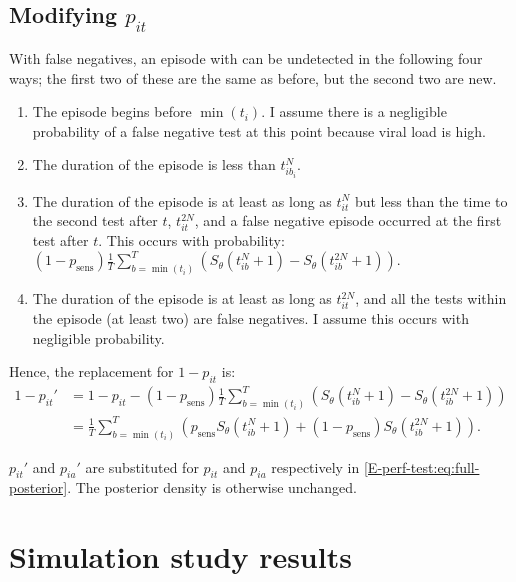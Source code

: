 \documentclass[thesis.tex]{subfiles}
\begin{document}
\subsection{Modifying \texorpdfstring{$p_{it}$}{pit}} \label{modifying-p_it}

With false negatives, an episode with can be undetected in the following four ways; the first two of these are the same as before, but the second two are new.
\begin{enumerate}
\item
  The episode begins before $\min(t_i)$.
  I assume there is a negligible probability of a false negative test at this point because viral load is high.
\item
  The duration of the episode is less than $t_{ib_i}^N$.
\item
  The duration of the episode is at least as long as $t_{it}^N$ but less than the time to the second test after $t$, $t_{it}^{2N}$, and a false negative episode occurred at the first test after $t$.
  This occurs with probability:
  \begin{math}
    (1 - p_\text{sens})\frac{1}{T} \sum_{b=\min(t_i)}^T \left( S_\theta(t_{ib}^N + 1) - S_\theta(t_{ib}^{2N} + 1)\right).
  \end{math}
\item
  The duration of the episode is at least as long as $t_{it}^{2N}$, and all the tests within the episode (at least two) are false
negatives.
  I assume this occurs with negligible probability.
\end{enumerate}

Hence, the replacement for $1 - p_{it}$ is:
\begin{align}
1 - p_{it}'
&= 1 - p_{it} - (1 - p_\text{sens})\frac{1}{T} \sum_{b=\min(t_i)}^T \left( S_\theta(t_{ib}^N + 1) - S_\theta(t_{ib}^{2N} + 1)\right) \\
&= \frac{1}{T} \sum_{b=\min(t_i)}^T \left( p_\text{sens} S_\theta(t_{ib}^N + 1) + (1 - p_\text{sens}) S_\theta(t_{ib}^{2N} + 1)\right).
\end{align}

$p_{it}'$ and $p_{ia}'$ are substituted for $p_{it}$ and $p_{ia}$ respectively in \cref{E-perf-test:eq:full-posterior}.
The posterior density is otherwise unchanged.

\section{Simulation study results} \label{imperf-test:sec:sim-study-results}
\end{document}
